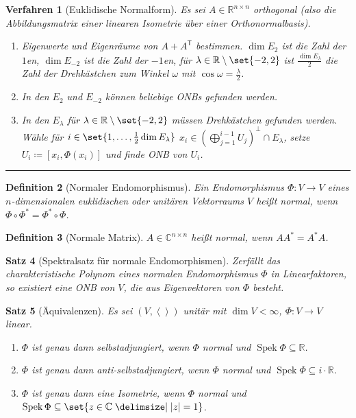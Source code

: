 \documentclass[a4paper]{article}
\newcounter{Sec}
\theoremstyle{marginbreak}
\newtheorem{definition}{Definition}[Sec]
\newtheorem{satz}[definition]{Satz}
\newtheorem{verfahren}[definition]{Verfahren}
\DeclareMathOperator{\Spek}{Spek}
\newcommand{\sep}{%
	\rule{\textwidth}{0.3pt}%
	\stepcounter{Sec}%
	}
\newcommand\scp[1]{\left\langle#1\right\rangle}
\newcommand\transpose[1]{#1^{\mathsf{T}}}
\begin{document}
	\begin{verfahren}[Euklidische Normalform]
		Es sei $A\in\mathbb{R}^{n\times n}$ orthogonal (also die Abbildungsmatrix einer
		linearen Isometrie über einer Orthonormalbasis).
		\begin{enumerate}
			\item Eigenwerte und Eigenräume von $A+\transpose{A}$ bestimmen. $\dim E_2$ ist
				die Zahl der $1$en, $\dim E_{-2}$ ist die Zahl der $-1$en, für
				$\lambda\in\mathbb{R}\setminus\set{-2, 2}$ ist $\frac{\dim E_\lambda}{2}$ die
				Zahl der Drehkästchen zum Winkel $\omega$ mit $\cos\omega = \frac{\lambda}{2}$.
			\item In den $E_2$ und $E_{-2}$ können beliebige ONBs gefunden werden.
			\item In den $E_\lambda$ für $\lambda\in\mathbb{R}\setminus\set{-2, 2}$ müssen Drehkästchen
				gefunden werden. Wähle für $i\in\set{1,\ldots,\frac{1}{2}\dim E_\lambda}$
				$x_i\in(\bigoplus_{j=1}^{i-1}U_j)^\perp\cap E_\lambda$, setze $U_i\coloneqq[x_i, \Phi(x_i)]$ und finde
				ONB von $U_i$.
		\end{enumerate}
	\end{verfahren}
	\sep
	\begin{definition}[Normaler Endomorphismus]
		Ein Endomorphismus $\Phi\colon V\to V$ eines $n$-dimensionalen euklidischen oder unitären Vektorraums
		$V$ heißt normal, wenn $\Phi\circ\Phi^*=\Phi^*\circ\Phi$.
	\end{definition}
	\begin{definition}[Normale Matrix]
		$A\in\mathbb{C}^{n\times n}$ heißt normal, wenn $AA^*=A^*A$.
	\end{definition}
	\begin{satz}[Spektralsatz für normale Endomorphismen]
		Zerfällt das charakteristische Polynom eines normalen Endomorphismus $\Phi$ in Linearfaktoren,
		so existiert eine ONB von $V$, die aus Eigenvektoren von $\Phi$ besteht.
	\end{satz}
	\begin{satz}[Äquivalenzen]
		Es sei $(V, \scp{})$ unitär mit $\dim V<\infty$, $\Phi\colon V\to V$ linear.
		\begin{enumerate}[label=(\alph*)]
			\item $\Phi$ ist genau dann selbstadjungiert, wenn $\Phi$ normal und $\Spek\Phi\subseteq\mathbb{R}$.
			\item $\Phi$ ist genau dann anti-selbstadjungiert, wenn $\Phi$ normal und $\Spek\Phi\subseteq i\cdot\mathbb{R}$.
			\item $\Phi$ ist genau dann eine Isometrie, wenn $\Phi$ normal und $\Spek\Phi\subseteq\set{z\in\mathbb{C}\given\abs{z}=1}$.
		\end{enumerate}
	\end{satz}
\end{document}
